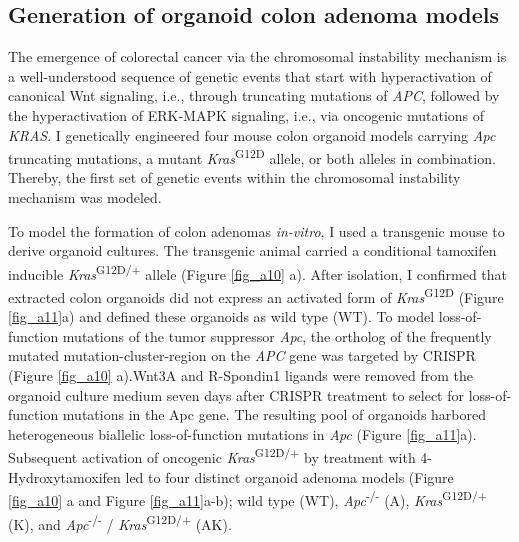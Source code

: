 \begin{flushleft}
\clearpage
\subsection{Generation of organoid colon adenoma models}

The emergence of colorectal cancer via the chromosomal instability mechanism is a well-understood sequence of genetic events that start with hyperactivation of canonical Wnt signaling, i.e., through truncating mutations of \textit{APC}, followed by the hyperactivation of ERK-MAPK signaling, i.e., via oncogenic mutations of \textit{KRAS}. I genetically engineered four mouse colon organoid models carrying \textit{Apc} truncating mutations, a mutant \textit{Kras}\textsuperscript{G12D} allele, or both alleles in combination. Thereby, the first set of genetic events within the chromosomal instability mechanism was modeled. 
\bigbreak

To model the formation of colon adenomas \textit{in-vitro}, I used a transgenic mouse to derive organoid cultures. The transgenic animal carried a conditional tamoxifen inducible \textit{Kras}\textsuperscript{G12D/+} allele \parencite{jacksonAnalysisLungTumor2001} (Figure \ref{fig_a10} a). After isolation, I confirmed that extracted colon organoids did not express an activated form of \textit{Kras}\textsuperscript{G12D} (Figure \ref{fig_a11}a) and defined these organoids as wild type (WT). To model loss-of-function mutations of the tumor suppressor \textit{Apc}, the ortholog of the frequently mutated mutation-cluster-region on the \textit{APC} gene was targeted by CRISPR (Figure \ref{fig_a10} a).Wnt3A and R-Spondin1 ligands were removed from the organoid culture medium seven days after CRISPR treatment to select for loss-of-function mutations in the Apc gene. The resulting pool of organoids harbored heterogeneous biallelic loss-of-function mutations in \textit{Apc} (Figure \ref{fig_a11}a). Subsequent activation of oncogenic \textit{Kras}\textsuperscript{G12D/+} by treatment with 4-Hydroxytamoxifen led to four distinct organoid adenoma models (Figure \ref{fig_a10} a and Figure \ref{fig_a11}a-b); wild type (WT), \textit{Apc}\textsuperscript{-/-}
  (A), \textit{Kras}\textsuperscript{G12D/+} (K), and \textit{Apc}\textsuperscript{-/-} / \textit{Kras}\textsuperscript{G12D/+} (AK).



\end{flushleft}
